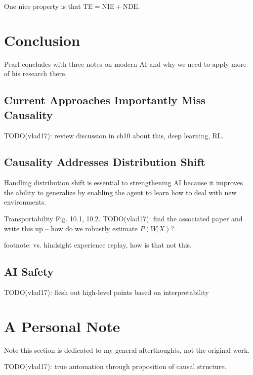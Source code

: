 \documentclass{article}
\begin{document}
One nice property is that $\mathrm{TE}=\mathrm{NIE}+\mathrm{NDE}$.

\section{Conclusion}

Pearl concludes with three notes on modern AI and why we need to apply more of his research there.

\subsection{Current Approaches Importantly Miss Causality}

TODO(vlad17): review discussion in ch10 about this, deep learning, RL.

\subsection{Causality Addresses Distribution Shift}

Handling distribution shift is essential to strengthening AI because it improves the ability to generalize by enabling the agent to learn how to deal with new environments.

Transportability Fig. 10.1, 10.2. TODO(vlad17): find the associated paper and write this up -- how do we robustly estimate $P(W|X)$?


footnote: vs. hindsight experience replay, how is that not this.

\subsection{AI Safety}

TODO(vlad17): flesh out high-level points based on interpretability

\section*{A Personal Note}

Note this section is dedicated to my general afterthoughts, not the original work.

TODO(vlad17): true automation through proposition of causal structure.


{}

\end{document}
